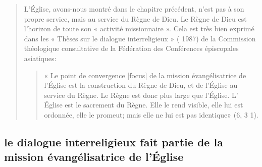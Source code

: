 \begin{quote}
L'Église, avons-nous montré dans le chapitre précédent,
n'est pas à son propre service, mais au service du Règne de
Dieu. Le Règne de Dieu est l'horizon de toute son « activité
missionnaire ». Cela est très bien exprimé dans les « Thèses
sur le dialogue interreligieux » ( 1987) de la Commission théologique
consultative de la Fédération des Conférences épiscopales
asiatiques: \begin{quote}
    « Le point de convergence [focus] de la
mission évangélisatrice de l'Église est la construction du
Règne de Dieu, et de l'Église au service du Règne. Le Règne
est donc plus large que l'Église. L' Église est le sacrement du
Règne. Elle le rend visible, elle lui est ordonnée, elle le promeut;
mais elle ne lui est pas identique» (6, 3 1).
\end{quote}

\end{quote}

\subsection{le dialogue interreligieux
fait partie de la mission évangélisatrice de l’Église}



